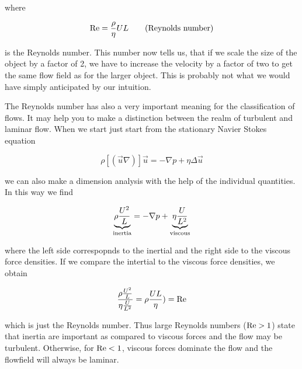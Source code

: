\documentclass[letterpaper,10pt,english]{sphinxmanual}
\begin{document}
\sphinxAtStartPar
where

\sphinxAtStartPar
\begin{equation}
{\rm Re}=\frac{\rho}{\eta}U L \tag{Reynolds number}
\end{equation}

\sphinxAtStartPar
is the Reynolds number. This number now tells us, that if we scale the size of the object by a factor of 2, we have to increase the velocity by a factor of two to get the same flow field as for the larger object. This is probably not what we would have simply anticipated by our intuition.

\sphinxAtStartPar
The Reynolds number has also a very important meaning for the classification of flows. It may help you to make a distinction between the realm of turbulent and laminar flow. When we start just start from the stationary Navier Stokes equation

\sphinxAtStartPar
\begin{equation}
\rho \left [(\vec{u}\nabla)\right]\vec{u}=-\nabla p +\eta \Delta \vec{u}
\end{equation}

\sphinxAtStartPar
we can also make a dimension analysis with the help of the individual quantities. In this way we find

\sphinxAtStartPar
\begin{equation}
\underbrace{\rho \frac{U^2}{L}}_{\rm inertia}=-\nabla p +\underbrace{\eta \frac{U}{L^2}}_{\rm viscous}
\end{equation}

\sphinxAtStartPar
where the left side correspopnds to the inertial and the right side to the viscous force densities. If we compare the intertial to the viscous force densities, we obtain

\sphinxAtStartPar
\begin{equation}
\frac{\rho \frac{U^2}{L}}{\eta \frac{U}{L^2}}=\rho\frac{U L}{\eta})={\rm Re}
\end{equation}

\sphinxAtStartPar
which is just the Reynolds number. Thus large Reynolds numbers (\({\rm Re >1}\)) state that inertia are important as compared to viscous forces and the flow may be turbulent. Otherwise, for \({\rm Re}<1\), viscous forces dominate the flow and the flowfield will always be laminar.
\end{document}
